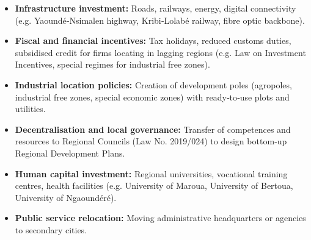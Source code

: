 \documentclass[11pt]{article}
\newcommand{\cle}[1]{{\popxbold\color{popdark}#1}}
\begin{document}
\begin{propriete}
\begin{itemize}
    \item \textbf{Infrastructure investment:} Roads, railways, energy, digital connectivity (e.g. Yaoundé‑Nsimalen highway, Kribi‑Lolabé railway, fibre optic backbone).
    \item \textbf{Fiscal and financial incentives:} Tax holidays, reduced customs duties, subsidised credit for firms locating in lagging regions (e.g. Law on Investment Incentives, special regimes for industrial free zones).
    \item \textbf{Industrial location policies:} Creation of \cle{development poles} (agropoles, industrial free zones, special economic zones) with ready‑to‑use plots and utilities.
    \item \textbf{Decentralisation and local governance:} Transfer of competences and resources to Regional Councils (Law No. 2019/024) to design bottom‑up Regional Development Plans.
    \item \textbf{Human capital investment:} Regional universities, vocational training centres, health facilities (e.g. University of Maroua, University of Bertoua, University of Ngaoundéré).
    \item \textbf{Public service relocation:} Moving administrative headquarters or agencies to secondary cities.
\end{itemize}
\end{propriete}
\end{document}
